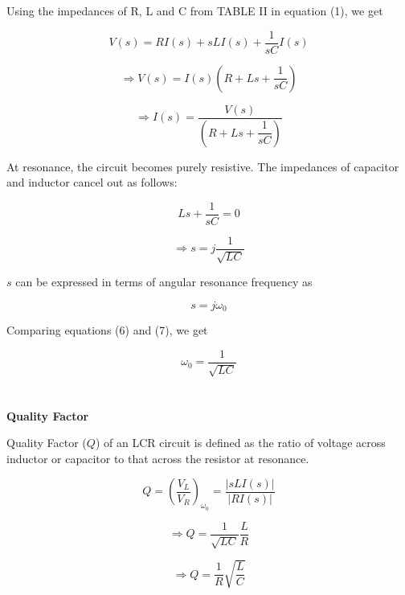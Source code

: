 \documentclass[journal,12pt,twocolumn]{IEEEtran}
\theoremstyle{remark}
\begin{document}
Using the impedances of R, L and C from TABLE II in equation (1), we get

\begin{equation}
    V(s) = R I(s) + sL I(s) + \dfrac{1}{sC} I(s)
\end{equation}

\begin{equation}
    \Rightarrow V(s) = I(s)\left(R + Ls + \dfrac{1}{sC}\right)
\end{equation}

\begin{equation}
    \Rightarrow I(s) = \dfrac{V(s)}{\left(R + Ls + \dfrac{1}{sC}\right)}
\end{equation}

At resonance, the circuit becomes purely resistive. The impedances of capacitor and inductor cancel out as follows:

\begin{equation}
    Ls + \dfrac{1}{sC} = 0
\end{equation}

\begin{equation}
    \Rightarrow s = j\dfrac{1}{\sqrt{LC}} \label{eq: 6}
\end{equation}

$s$ can be expressed in terms of angular resonance frequency as

\begin{equation}
    s = j\omega_0 \label{eq: 7}
\end{equation}

Comparing equations (6) and (7), we get

\begin{equation}
    \omega_0 = \dfrac{1}{\sqrt{LC}}
\end{equation}\\
\\
\textbf{Quality Factor}

Quality Factor ($Q$) of an LCR circuit is defined as the ratio of voltage across inductor or capacitor to that across the resistor at resonance.

\begin{equation}
    Q = \left(\dfrac{V_L}{V_R}\right)_{\omega_0} = \dfrac{\lvert{sLI(s)}\rvert}{\lvert RI(s) \rvert}
\end{equation}

\begin{equation}
    \Rightarrow Q = \dfrac{1}{\sqrt{LC}}\dfrac{L}{R}
\end{equation}

\begin{equation}
    \Rightarrow Q = \dfrac{1}{R}\sqrt{\dfrac{L}{C}}
\end{equation}


\renewcommand{\thefigure}{\theenumi}
\renewcommand{\thetable}{\theenumi}
\end{document}
